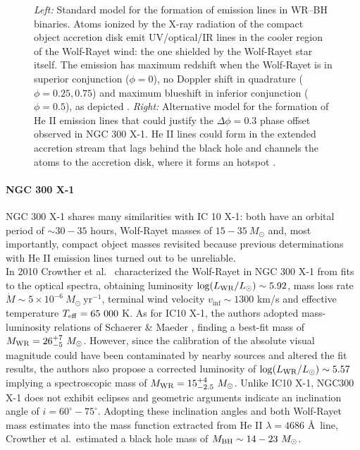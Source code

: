 \documentclass[a4paper,titlepage]{book}     	%
\newcommand{\sun}{\ensuremath{_\odot}}
\newcommand{\mdot}{\ensuremath{\dot{M}}}
\newcommand{\msun}{\ensuremath{M\sun}}
\newcommand{\lsun}{L_{\odot}}
\newcommand{\yr}{\text{yr}}
\newcommand{\mwr}{\ensuremath{M_\textup{WR}}}
\newcommand{\mbh}{\ensuremath{M_\textup{BH}}}
\begin{document}
\begin{figure}[t!]
\begin{minipage}{.60\textwidth}
	\end{minipage}
	\caption{\emph{Left:} Standard model for the formation of emission lines in WR--BH binaries. Atoms ionized by the X-ray radiation of the compact object accretion disk emit UV/optical/IR lines in the cooler region of the Wolf-Rayet wind: the one shielded by the Wolf-Rayet star itself. The emission has maximum redshift when the Wolf-Rayet is in superior conjunction ($\phi = 0$), no Doppler shift in quadrature ($\phi = 0.25,0.75$) and maximum blueshift in inferior conjunction ($\phi = 0.5$), as depicted \cite{ICX10X-1_Laycock2015_revisited}. \emph{Right:} Alternative model for the formation of He II emission lines that could justify the $\Delta \phi = 0.3$ phase offset observed in NGC 300 X-1. He II lines could form in the extended accretion stream that lags behind the black hole and channels the atoms to the accretion disk, where it forms an hotspot \cite{NGC300X-1_Binder2021_BHpreciso}.}\label{fig:WRBHwind}
\end{figure}


\paragraph{NGC 300 X-1} NGC 300 X-1 shares many similarities with IC 10 X-1: both have an orbital period of $\sim 30-35$ hours, Wolf-Rayet masses of $15-35~\msun$ and, most importantly, compact object masses revisited because previous determinations with He II emission lines turned out to be unreliable.\\

In 2010 Crowther et al.\ \cite{NGC300X-1_Crowther2010} characterized the Wolf-Rayet in NGC 300 X-1 from fits to the optical spectra, obtaining luminosity $\log(L_{\rm WR}/\lsun) \sim 5.92$, mass loss rate $\mdot \sim 5 \times 10^{-6}~\msun~\yr^{-1}$, terminal wind velocity $v_{\inf} \sim 1300$ km/s and effective temperature $T_{\rm eff} = 65~000$ K. As for IC10 X-1, the authors adopted mass-luminosity relations of Schaerer \& Maeder \cite{schaerer1992MLrelationWR}, finding a best-fit mass of $\mwr = 26_{-5}^{+7}~\msun$. However, since the calibration of the absolute visual magnitude could have been contaminated by nearby sources and altered the fit results, the authors also propose a corrected luminosity of $\log(L_{\rm WR}/\lsun) \sim 5.57$ implying a spectroscopic mass of $\mwr = 15_{-2.5}^{+4}~\msun$. Unlike IC10 X-1, NGC300 X-1 does not exhibit eclipses and geometric arguments indicate an inclination angle of $i=60^{\circ}-75^{\circ}$. Adopting these inclination angles and both Wolf-Rayet mass estimates into the mass function extracted from He II $\lambda=4686$ \AA~line, Crowther et al.\ estimated a black hole mass of $
\mbh \sim 14-23~\msun$.\\
\end{document}

